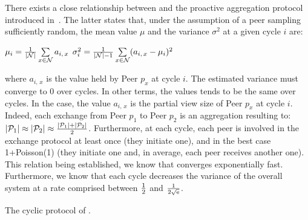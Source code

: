 There exists a close relationship between \SCAMPLON{} and the proactive
aggregation protocol introduced
in~\cite{jelasity2004epidemic,montresor2004robust}. The latter states that,
under the assumption of a peer sampling sufficiently random, the mean value
$\mu$ and the variance $\sigma^2$ at a given cycle $i$ are:
\begin{center}
  $\mu_i = {1\over{|\mathcal{N}|}} \sum\limits_{x \in \mathcal{N}} a_{i,\,x}$
  \hfill
  $\sigma^2_i = {1\over{|\mathcal{N}|-1}}\sum\limits_{x \in \mathcal{N}}
  (a_{i,\,x} - \mu_i)^2$
\end{center}
where $a_{i,\,x}$ is the value held by Peer $p_x$ at cycle $i$. The estimated
variance must converge to $0$ over cycles. In other terms, the values tends to
be the same over cycles. In the \SCAMPLON{} case, the value $a_{i,\,x}$ is the
partial view size of Peer $p_x$ at cycle $i$. Indeed, each exchange from Peer
$p_1$ to Peer $p_2$ is an aggregation resulting to:
$|\mathcal{P}_1|\approx|\mathcal{P}_2|\approx{|\mathcal{P}_1| + |\mathcal{P}_2|
  \over{2}}$.
Furthermore, at each cycle, each peer is involved in the exchange protocol at
least once (they initiate one), and in the best case 1+Poisson(1) (they
initiate one and, in average, each peer receives another one). This
relation being established, we know that \SCAMPLON{} converges exponentially
fast. Furthermore, we know that each cycle decreases the variance of the
overall system at a rate comprised between ${1\over{2}}$ and
$1\over{2\sqrt{\text{e}}}$.

\begin{algorithm}
  
  \caption{\label{algo:scamplon}The cyclic protocol of \SCAMPLON{}.}
\end{algorithm}


